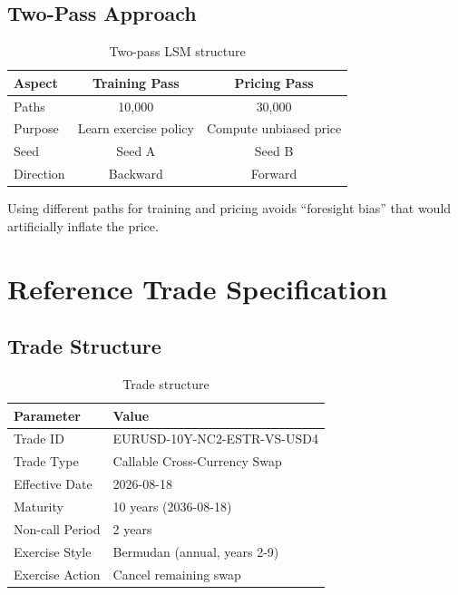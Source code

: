 \documentclass[10pt,a4paper]{article}
\begin{document}
\subsection{Two-Pass Approach}

\begin{table}[H]
\centering
\begin{tabular}{lcc}
\toprule
\textbf{Aspect} & \textbf{Training Pass} & \textbf{Pricing Pass} \\
\midrule
Paths & 10,000 & 30,000 \\
Purpose & Learn exercise policy & Compute unbiased price \\
Seed & Seed A & Seed B \\
Direction & Backward & Forward \\
\bottomrule
\end{tabular}
\caption{Two-pass LSM structure}
\end{table}

Using different paths for training and pricing avoids ``foresight bias'' that would artificially inflate the price.

\newpage

\section{Reference Trade Specification}

\subsection{Trade Structure}

\begin{table}[H]
\centering
\begin{tabular}{ll}
\toprule
\textbf{Parameter} & \textbf{Value} \\
\midrule
Trade ID & EURUSD-10Y-NC2-ESTR-VS-USD4 \\
Trade Type & Callable Cross-Currency Swap \\
Effective Date & 2026-08-18 \\
Maturity & 10 years (2036-08-18) \\
\midrule
Non-call Period & 2 years \\
Exercise Style & Bermudan (annual, years 2-9) \\
Exercise Action & Cancel remaining swap \\
\bottomrule
\end{tabular}
\caption{Trade structure}
\end{table}
\end{document}
